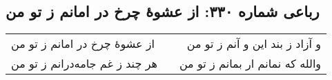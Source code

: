 \begin{center}
\section*{رباعی شماره ۳۳۰: از عشوهٔ چرخ در امانم ز تو من}
\label{sec:sh330}
\begin{longtable}{l p{0.5cm} r}
از عشوهٔ چرخ در امانم ز تو من
&&
و آزاد ز بند این و آنم ز تو من
\\
هر چند ز غم جامه‌درانم ز تو من
&&
والله که نمانم ار بمانم ز تو من
\\
\end{longtable}
\end{center}
